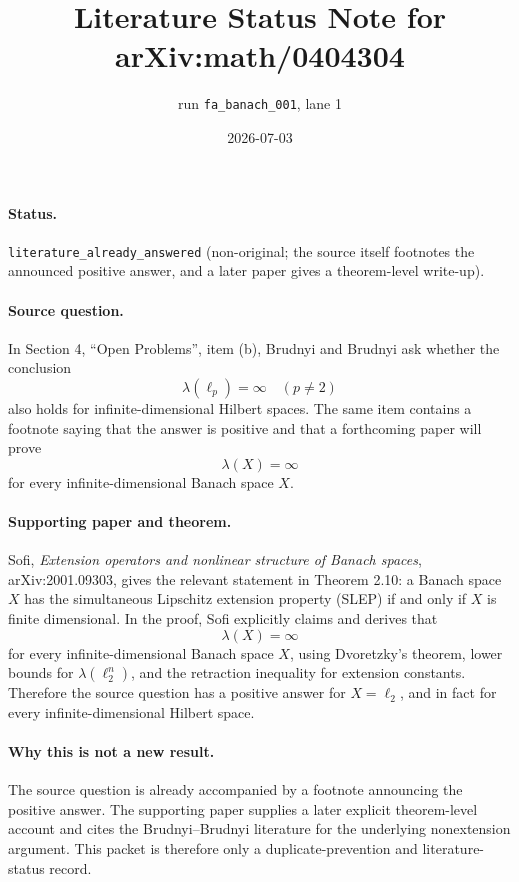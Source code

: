 \documentclass[11pt]{article}
\title{Literature Status Note for arXiv:math/0404304}
\author{run \texttt{fa\_banach\_001}, lane 1}
\date{2026-07-03}
\begin{document}
\maketitle

\paragraph{Status.}
\texttt{literature\_already\_answered} (non-original; the source itself footnotes the announced positive answer, and a later paper gives a theorem-level write-up).

\paragraph{Source question.}
In Section 4, ``Open Problems'', item (b), Brudnyi and Brudnyi ask whether the conclusion
\[
  \lambda(\ell_p)=\infty \quad (p\neq 2)
\]
also holds for infinite-dimensional Hilbert spaces.  The same item contains a footnote saying that the answer is positive and that a forthcoming paper will prove
\[
  \lambda(X)=\infty
\]
for every infinite-dimensional Banach space \(X\).

\paragraph{Supporting paper and theorem.}
Sofi, \emph{Extension operators and nonlinear structure of Banach spaces}, arXiv:2001.09303, gives the relevant statement in Theorem 2.10: a Banach space \(X\) has the simultaneous Lipschitz extension property (SLEP) if and only if \(X\) is finite dimensional.  In the proof, Sofi explicitly claims and derives that
\[
  \lambda(X)=\infty
\]
for every infinite-dimensional Banach space \(X\), using Dvoretzky's theorem, lower bounds for \(\lambda(\ell_2^n)\), and the retraction inequality for extension constants.  Therefore the source question has a positive answer for \(X=\ell_2\), and in fact for every infinite-dimensional Hilbert space.

\paragraph{Why this is not a new result.}
The source question is already accompanied by a footnote announcing the positive answer.  The supporting paper supplies a later explicit theorem-level account and cites the Brudnyi--Brudnyi literature for the underlying nonextension argument.  This packet is therefore only a duplicate-prevention and literature-status record.
\end{document}
